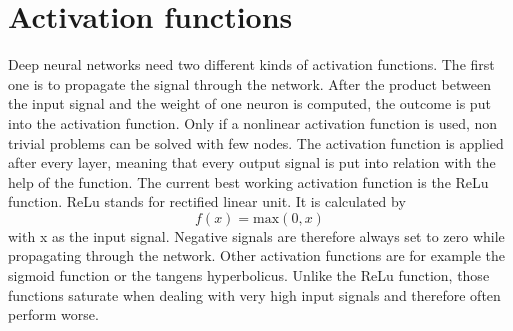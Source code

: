 \section{Activation functions}
Deep neural networks need two different kinds of activation functions. The first one is to propagate the signal through the network. After the product between the input signal and the weight of one neuron is computed, the outcome is put into the activation function. Only if a nonlinear activation function is used, non trivial problems can be solved with few nodes. The activation function is applied after every layer, meaning that every output signal is put into relation with the help of the function. The current best working activation function is the ReLu function. ReLu stands for rectified linear unit. It is calculated by
\begin{equation}
f(x) = \mathrm{max} (0,x)
\end{equation}
with x as the input signal. Negative signals are therefore always set to zero while propagating through the network. Other activation functions are for example the sigmoid function or the tangens hyperbolicus. Unlike the ReLu function, those functions saturate when dealing with very high input signals and therefore often perform worse.


